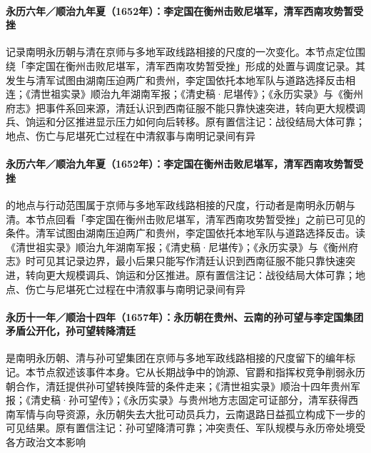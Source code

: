\paragraph{永历六年／顺治九年夏（1652年）：李定国在衡州击败尼堪军，清军西南攻势暂受挫}
 记录南明永历朝与清在京师与多地军政线路相接的尺度的一次变化。本节点定位围绕「李定国在衡州击败尼堪军，清军西南攻势暂受挫」形成的处置与调度记录。其发生与清军试图由湖南压迫两广和贵州，李定国依托本地军队与道路选择反击相连；《清世祖实录》顺治九年湖南军报；《清史稿·尼堪传》；《永历实录》与《衡州府志》把事件系回来源，清廷认识到西南征服不能只靠快速突进，转向更大规模调兵、饷运和分区推进显示压力如何向后转移。原有置信注记：战役结局大体可靠；地点、伤亡与尼堪死亡过程在中清叙事与南明记录间有异

\paragraph{永历六年／顺治九年夏（1652年）：李定国在衡州击败尼堪军，清军西南攻势暂受挫}
 的地点与行动范围属于京师与多地军政线路相接的尺度，行动者是南明永历朝与清。本节点回看「李定国在衡州击败尼堪军，清军西南攻势暂受挫」之前已可见的条件。清军试图由湖南压迫两广和贵州，李定国依托本地军队与道路选择反击。读《清世祖实录》顺治九年湖南军报；《清史稿·尼堪传》；《永历实录》与《衡州府志》时可见其记录边界，最小后果只能写作清廷认识到西南征服不能只靠快速突进，转向更大规模调兵、饷运和分区推进。原有置信注记：战役结局大体可靠；地点、伤亡与尼堪死亡过程在中清叙事与南明记录间有异

\paragraph{永历十一年／顺治十四年（1657年）：永历朝在贵州、云南的孙可望与李定国集团矛盾公开化，孙可望转降清廷}
 是南明永历朝、清与孙可望集团在京师与多地军政线路相接的尺度留下的编年标记。本节点叙述该事件本身。它从长期战争中的饷源、官爵和指挥权竞争削弱永历朝合作，清廷提供孙可望转换阵营的条件走来；《清世祖实录》顺治十四年贵州军报；《清史稿·孙可望传》；《永历实录》与贵州地方志固定可证部分，清军获得西南军情与向导资源，永历朝失去大批可动员兵力，云南退路日益孤立构成下一步的可见结果。原有置信注记：孙可望降清可靠；冲突责任、军队规模与永历帝处境受各方政治文本影响

